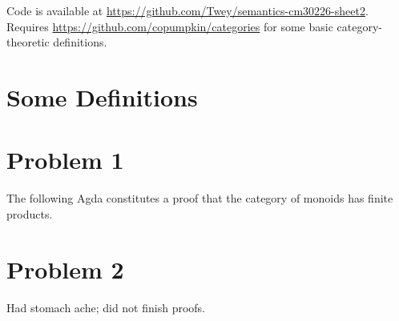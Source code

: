 \documentclass{article}
\begin{document}
Code is available at
\url{https://github.com/Twey/semantics-cm30226-sheet2}.  Requires
\url{https://github.com/copumpkin/categories} for some basic
category-theoretic definitions.

\section{Some Definitions}



\section{Problem 1}
The following Agda constitutes a proof that the category of monoids
has finite products.



\section{Problem 2}
Had stomach ache; did not finish proofs. \frownie
\end{document}
